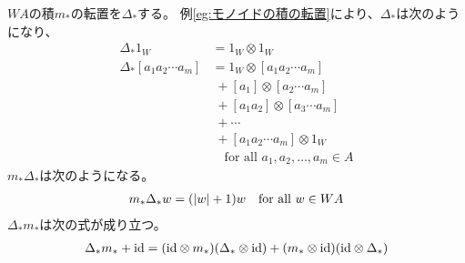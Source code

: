 	\begin{example}[文字列の連結の転置]\label{eg:文字列の連結の転置} %
		$WA$の積$m_*$の転置を$\Delta_*$する。
		例\ref{eg:モノイドの積の転置}により、$\Delta_*$は次のようになり、
		\begin{equation*}\begin{split} %
			\Delta_*1_W &= 1_W\otimes 1_W \\
			\Delta_*[a_1a_2\cdots a_m] &= 1_W\otimes [a_1a_2\cdots a_m] \\
			&\;+ [a_1]\otimes [a_2\cdots a_m] \\
			&\;+ [a_1a_2]\otimes [a_3\cdots a_m] \\
			&\;+ \cdots \\
			&\;+ [a_1a_2\cdots a_m]\otimes 1_W \\
			&\quad\text{for all }a_1,a_2,\dots, a_m\in A
		\end{split}\end{equation*} %
		$m_*\Delta_*$は次のようになる。
		\begin{equation*}\begin{split} %
			m_*\Delta_*w = (\zettai{w}+1)w \quad\text{for all }w\in WA
		\end{split}\end{equation*} %
		$\Delta_*m_*$は次の式が成り立つ。
		\begin{equation*}\begin{split} %
			\Delta_*m_* + \myid
			= (\myid\otimes m_*)(\Delta_*\otimes \myid)
			+ (m_*\otimes \myid)(\myid\otimes \Delta_*)
		\end{split}\end{equation*} %
	\end{example} %

